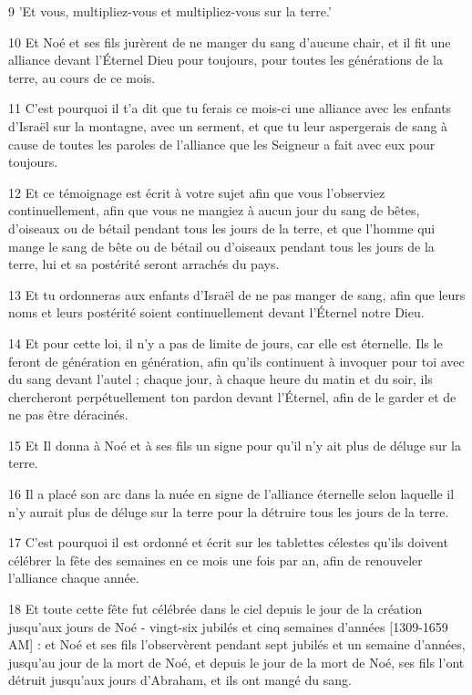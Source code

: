 \par 9 'Et vous, multipliez-vous et multipliez-vous sur la terre.'
\par 10 Et Noé et ses fils jurèrent de ne manger du sang d'aucune chair, et il fit une alliance devant l'Éternel Dieu pour toujours, pour toutes les générations de la terre, au cours de ce mois.
\par 11 C'est pourquoi il t'a dit que tu ferais ce mois-ci une alliance avec les enfants d'Israël sur la montagne, avec un serment, et que tu leur aspergerais de sang à cause de toutes les paroles de l'alliance que les Seigneur a fait avec eux pour toujours.
\par 12 Et ce témoignage est écrit à votre sujet afin que vous l'observiez continuellement, afin que vous ne mangiez à aucun jour du sang de bêtes, d'oiseaux ou de bétail pendant tous les jours de la terre, et que l'homme qui mange le sang de bête ou de bétail ou d'oiseaux pendant tous les jours de la terre, lui et sa postérité seront arrachés du pays.
\par 13 Et tu ordonneras aux enfants d'Israël de ne pas manger de sang, afin que leurs noms et leurs postérité soient continuellement devant l'Éternel notre Dieu.
\par 14 Et pour cette loi, il n'y a pas de limite de jours, car elle est éternelle. Ils le feront de génération en génération, afin qu'ils continuent à invoquer pour toi avec du sang devant l'autel ; chaque jour, à chaque heure du matin et du soir, ils chercheront perpétuellement ton pardon devant l'Éternel, afin de le garder et de ne pas être déracinés.
\par 15 Et Il donna à Noé et à ses fils un signe pour qu'il n'y ait plus de déluge sur la terre.
\par 16 Il a placé son arc dans la nuée en signe de l'alliance éternelle selon laquelle il n'y aurait plus de déluge sur la terre pour la détruire tous les jours de la terre.
\par 17 C'est pourquoi il est ordonné et écrit sur les tablettes célestes qu'ils doivent célébrer la fête des semaines en ce mois une fois par an, afin de renouveler l'alliance chaque année.
\par 18 Et toute cette fête fut célébrée dans le ciel depuis le jour de la création jusqu'aux jours de Noé - vingt-six jubilés et cinq semaines d'années [1309-1659 AM] : et Noé et ses fils l'observèrent pendant sept jubilés et un semaine d'années, jusqu'au jour de la mort de Noé, et depuis le jour de la mort de Noé, ses fils l'ont détruit jusqu'aux jours d'Abraham, et ils ont mangé du sang.
